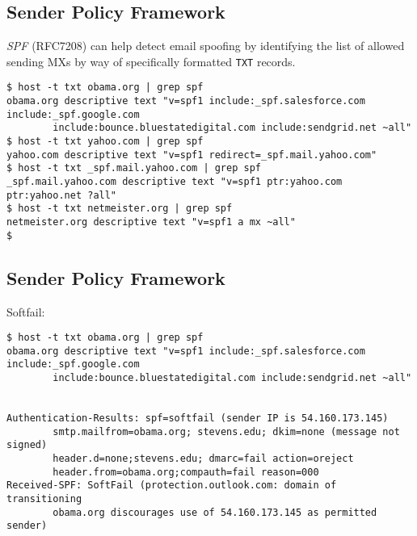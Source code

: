 \documentclass[xga]{xdvislides}
\begin{document}
\subsection{Sender Policy Framework}
{\em SPF} (RFC7208) can help detect email spoofing by identifying the
list of allowed sending MXs by way of specifically
formatted {\tt TXT} records. \\

\begin{verbatim}
$ host -t txt obama.org | grep spf
obama.org descriptive text "v=spf1 include:_spf.salesforce.com include:_spf.google.com
        include:bounce.bluestatedigital.com include:sendgrid.net ~all"
$ host -t txt yahoo.com | grep spf
yahoo.com descriptive text "v=spf1 redirect=_spf.mail.yahoo.com"
$ host -t txt _spf.mail.yahoo.com | grep spf
_spf.mail.yahoo.com descriptive text "v=spf1 ptr:yahoo.com ptr:yahoo.net ?all"
$ host -t txt netmeister.org | grep spf
netmeister.org descriptive text "v=spf1 a mx ~all"
$ 
\end{verbatim}

\subsection{Sender Policy Framework}
Softfail:
\begin{verbatim}
$ host -t txt obama.org | grep spf
obama.org descriptive text "v=spf1 include:_spf.salesforce.com include:_spf.google.com
        include:bounce.bluestatedigital.com include:sendgrid.net ~all"


Authentication-Results: spf=softfail (sender IP is 54.160.173.145)
        smtp.mailfrom=obama.org; stevens.edu; dkim=none (message not signed)
        header.d=none;stevens.edu; dmarc=fail action=oreject
        header.from=obama.org;compauth=fail reason=000
Received-SPF: SoftFail (protection.outlook.com: domain of transitioning
        obama.org discourages use of 54.160.173.145 as permitted sender)
\end{verbatim}
\end{document}
